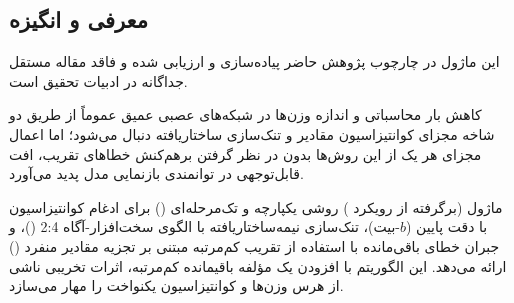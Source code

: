 \subsection{معرفی و انگیزه}
این ماژول در چارچوب پژوهش حاضر پیاده‌سازی و ارزیابی شده و فاقد مقاله مستقل جداگانه در ادبیات تحقیق است.

کاهش بار محاسباتی و اندازه وزن‌ها در شبکه‌های عصبی عمیق عموماً از طریق دو شاخه مجزای کوانتیزاسیون مقادیر و تنک‌سازی ساختاریافته دنبال می‌شود؛ اما اعمال مجزای هر یک از این روش‌ها بدون در نظر گرفتن برهم‌کنش خطاهای تقریب، افت قابل‌توجهی در توانمندی بازنمایی مدل پدید می‌آورد. 

ماژول  (برگرفته از رویکرد ) روشی یکپارچه و تک‌مرحله‌ای () برای ادغام کوانتیزاسیون با دقت پایین ($b$-بیت)، تنک‌سازی نیمه‌ساختاریافته با الگوی سخت‌افزار-آگاه 2:4 ()، و جبران خطای باقی‌مانده با استفاده از تقریب کم‌مرتبه مبتنی بر تجزیه مقادیر منفرد () ارائه می‌دهد. این الگوریتم با افزودن یک مؤلفه باقیمانده کم‌مرتبه، اثرات تخریبی ناشی از هرس وزن‌ها و کوانتیزاسیون یکنواخت را مهار می‌سازد.
